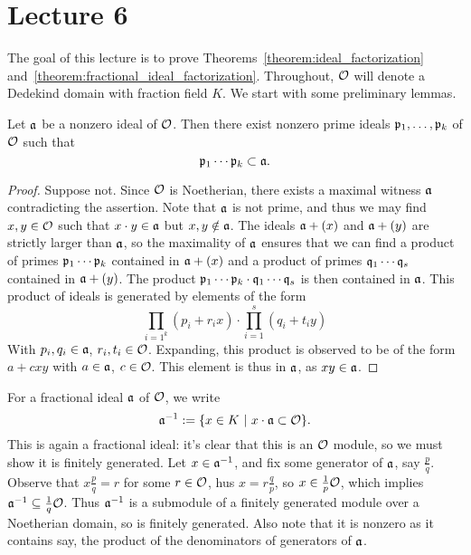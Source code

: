 \section{Lecture 6}

The goal of this lecture is to prove Theorems~\ref{theorem:ideal_factorization} and~\ref{theorem:fractional_ideal_factorization}.
Throughout, $\mathcal{O}$ will denote a Dedekind domain with fraction field $K$.
We start with some preliminary lemmas.

\begin{lemma}
  Let $\mathfrak{a}$ be a nonzero ideal of $\mathcal{O}$.
  Then there exist nonzero prime ideals $\mathfrak{p}_{1},\ldots,\mathfrak{p}_{k}$ of $\mathcal{O}$ such that
  \[ \mathfrak{p}_{1} \cdots \mathfrak{p}_{k} \subset \mathfrak{a}. \]
\end{lemma}
\begin{proof}
  Suppose not.
  Since $\mathcal{O}$ is Noetherian, there exists a maximal witness $\mathfrak{a}$ contradicting the assertion.
  Note that $\mathfrak{a}$ is not prime, and thus we may find $x,y \in \mathcal{O}$ such that $x \cdot y \in \mathfrak{a}$ but $x,y \notin \mathfrak{a}$.
  The ideals $\mathfrak{a} + (x)$ and $\mathfrak{a} + (y)$ are strictly larger than $\mathfrak{a}$, so the maximality of $\mathfrak{a}$ ensures that we can find a product of primes $\mathfrak{p}_{1} \cdots \mathfrak{p}_{k}$ contained in $\mathfrak{a} + (x)$ and a product of primes $\mathfrak{q}_{1} \cdots \mathfrak{q}_{s}$ contained in $\mathfrak{a} + (y)$.
  The product $\mathfrak{p}_{1} \cdots \mathfrak{p}_{k} \cdot \mathfrak{q}_{1} \cdots \mathfrak{q}_{s}$ is then contained in $\mathfrak{a}$.
  This product of ideals is generated by elements of the form
  \[\prod_{i=1^k}(p_i+r_ix)\cdot\prod_{i=1}^s(q_i+t_iy)\]
  With $p_i, q_i \in \mathfrak{a}$, $r_i, t_i \in \mathcal{O}$. 
  Expanding, this product is observed to be of the form $a+cxy$ with $a \in \mathfrak{a}$, $c \in \mathcal{O}$.
  This element is thus in $\mathfrak{a}$, as $xy \in \mathfrak{a}$.
\end{proof}

\begin{definition}
  For a fractional ideal $\mathfrak{a}$ of $\mathcal{O}$, we write
  \[ \mathfrak{a}^{-1} := \{x \in K \ | \ x \cdot \mathfrak{a} \subset \mathcal{O}\}. \]
  This is again a fractional ideal: it's clear that this is an $\mathcal{O}$ module, so we must show it is finitely generated.
  Let $x \in \mathfrak{a}^{-1}$, and fix some generator of $\mathfrak{a}$, say $\frac pq$.
  Observe that $x\frac pq=r$ for some $r\in \mathcal{O}$,  hus $x=r\frac qp$, so $x \in \frac 1p \mathcal{O}$, which implies $\mathfrak{a}^{-1}\subseteq \frac 1q \mathcal{O}$.
  Thus $\mathfrak{a}^{-1}$ is a submodule of a finitely generated module over a Noetherian domain, so is finitely generated.
  Also note that it is nonzero as it contains say, the product of the denominators of generators of $\mathfrak{a}$. 
\end{definition}

